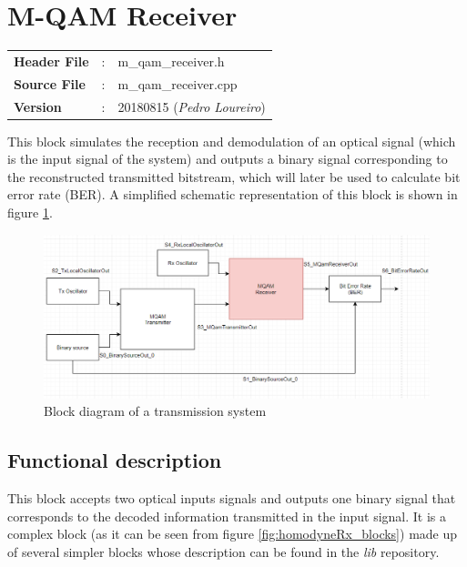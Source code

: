 \clearpage

\section{M-QAM Receiver}\label{lib:homodyneRx}

\begin{tcolorbox}	
	\begin{tabular}{p{2.75cm} p{0.2cm} p{10.5cm}} 	
		\textbf{Header File}   &:& m\_qam\_receiver.h \\
		\textbf{Source File}   &:& m\_qam\_receiver.cpp \\
        \textbf{Version}       &:& 20180815 (\emph{Pedro Loureiro})\\
	\end{tabular}
\end{tcolorbox}

This block simulates the reception and demodulation of an optical
signal (which is the input signal of the system) and outputs a binary signal
corresponding to the reconstructed transmitted bitstream, which will later be used to calculate bit error rate (BER).
 A simplified schematic representation of this block is shown in figure
\ref{fig:homodyneRx_simple}.
\begin{figure}[H]
	\centering
	\includegraphics[scale=0.75]{../lib/m_qam_receiver/figure_PLoureiro/Diagrama_Blocos.png}
	\caption{Block diagram of a transmission system}\label{fig:homodyneRx_simple}
\end{figure}

\subsection*{Functional description}

This block accepts two optical inputs signals and outputs one binary signal that
corresponds to the decoded information transmitted in the input signal. It is a
complex
block (as it can be seen from figure \ref{fig:homodyneRx_blocks}) made up of
several simpler blocks whose description can be found in the
\textit{lib} repository.

